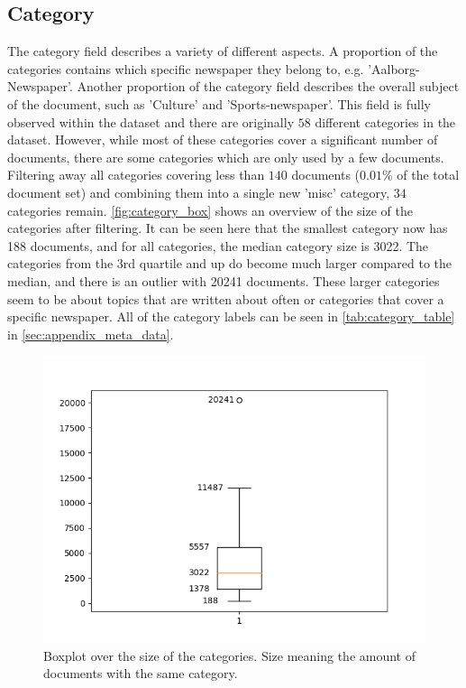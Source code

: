 \subsection{Category}
The category field describes a variety of different aspects.
A proportion of the categories contains which specific newspaper they belong to, e.g. 'Aalborg-Newspaper'.
Another proportion of the category field describes the overall subject of the document, such as 'Culture' and 'Sports-newspaper'.
This field is fully observed within the dataset and there are originally $58$ different categories in the dataset.
However, while most of these categories cover a significant number of documents, there are some categories which are only used by a few documents.
Filtering away all categories covering less than $140$ documents ($0.01\%$ of the total document set) and combining them into a single new 'misc' category, $34$ categories remain.
\autoref{fig:category_box} shows an overview of the size of the categories after filtering.
It can be seen here that the smallest category now has 188 documents, and for all categories, the median category size is 3022.
The categories from the 3rd quartile and up do become much larger compared to the median, and there is an outlier with 20241 documents.
These larger categories seem to be about topics that are written about often or categories that cover a specific newspaper.
All of the category labels can be seen in \autoref{tab:category_table} in \autoref{sec:appendix_meta_data}.

\begin{figure}
	\centering
	\includegraphics[width=1 \linewidth]{figures/category_box.png}
	\caption{Boxplot over the size of the categories. Size meaning the amount of documents with the same category.}
	\label{fig:category_box}
\end{figure}

